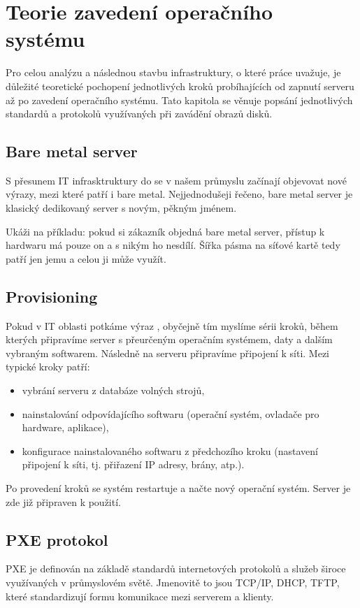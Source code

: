 \documentclass[thesis=B,czech]{FITthesis}[2012/06/26]
\begin{document}
\chapter{Teorie zavedení operačního systému}
Pro celou analýzu a následnou stavbu infrastruktury, o které práce uvažuje, je důležité teoretické pochopení jednotlivých kroků probíhajících od zapnutí serveru až po zavedení operačního systému. Tato kapitola se věnuje popsání jednotlivých standardů a protokolů využívaných při zavádění obrazů disků.


\section{Bare metal server}

S přesunem IT infrasktruktury do  se v našem průmyslu začínají objevovat nové výrazy, mezi které patří i bare metal. Nejjednodušeji řečeno, bare metal server je klasický dedikovaný server s novým, pěkným jménem. 

Ukáži na příkladu: pokud si zákazník objedná bare metal server, přístup k hardwaru má pouze on a s nikým ho nesdílí. Šířka pásma na síťové kartě tedy patří jen jemu a celou ji může využít. 


\section{Provisioning}

Pokud v IT oblasti potkáme výraz , obyčejně tím myslíme sérii kroků, během kterých připravíme server s přeurčeným operačním systémem, daty a dalším vybraným softwarem. Následně na serveru připravíme připojení k síti. Mezi typické kroky patří:

\begin{itemize}
\item vybrání serveru z databáze volných strojů,
\item nainstalování odpovídajícího softwaru (operační systém, ovladače pro hardware, aplikace),
\item konfigurace nainstalovaného softwaru z předchozího kroku (nastavení připojení k síti, tj. přiřazení IP adresy, brány, atp.).
\end{itemize}

Po provedení kroků se systém restartuje a načte nový operační systém. Server je zde již připraven k použití. 


\section{PXE protokol}
PXE je definován na základě standardů internetových protokolů a služeb široce využívaných v průmyslovém světě. Jmenovitě to jsou TCP/IP, DHCP, TFTP, které standardizují formu komunikace mezi serverem a klienty.\cite{pica}
\end{document}
